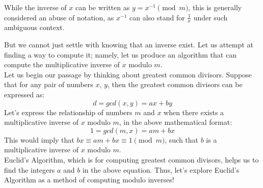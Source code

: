 While the inverse of $x$ can be written as $y = x^{-1}\pmod{m}$, this is generally considered an abuse of notation, as $x^{-1}$ can also stand for $\frac{1}{x}$ under such ambiguous context.

But we cannot just settle with knowing that an inverse exist. Let us attempt at finding a way to compute it; namely, let us produce an algorithm that can compute the multiplicative inverse of $x$ modulo $m$. \\
Let us begin our passage by thinking about greatest common divisors. Suppose that for any pair of numbers $x$, $y$, then the greatest common divisors can be expressed as:
\[d = gcd(x, y) = ax + by\]
Let's express the relationship of numbers $m$ and $x$ when there exists a multiplicative inverse of $x$ modulo $m$, in the above mathematical format:
\[1 = gcd(m, x) = am + bx\]
This would imply that $bx \equiv am + bx \equiv 1\pmod{m}$, such that $b$ is a multiplicative inverse of $x$ modulo $m$. \\
Euclid's Algorithm, which is for computing greatest common divisors, helps us to find the integers $a$ and $b$ in the above equation. Thus, let's explore Euclid's Algorithm as a method of computing modulo inverses!

